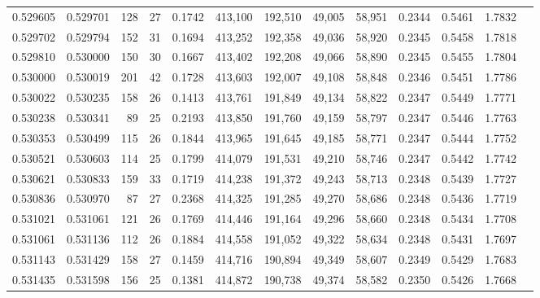 \begin{tabular}{rrrrrrrrrrrrr}
0.529605 & 0.529701 &    128 &    27 &                                     0.1742 & 413,100 & 192,510 &  49,005 &  58,951 & 0.2344 & 0.5461 & 1.7832 \\
0.529702 & 0.529794 &    152 &    31 &                                     0.1694 & 413,252 & 192,358 &  49,036 &  58,920 & 0.2345 & 0.5458 & 1.7818 \\
0.529810 & 0.530000 &    150 &    30 &                                     0.1667 & 413,402 & 192,208 &  49,066 &  58,890 & 0.2345 & 0.5455 & 1.7804 \\
0.530000 & 0.530019 &    201 &    42 &                                     0.1728 & 413,603 & 192,007 &  49,108 &  58,848 & 0.2346 & 0.5451 & 1.7786 \\
0.530022 & 0.530235 &    158 &    26 &                                     0.1413 & 413,761 & 191,849 &  49,134 &  58,822 & 0.2347 & 0.5449 & 1.7771 \\
0.530238 & 0.530341 &     89 &    25 &                                     0.2193 & 413,850 & 191,760 &  49,159 &  58,797 & 0.2347 & 0.5446 & 1.7763 \\
0.530353 & 0.530499 &    115 &    26 &                                     0.1844 & 413,965 & 191,645 &  49,185 &  58,771 & 0.2347 & 0.5444 & 1.7752 \\
0.530521 & 0.530603 &    114 &    25 &                                     0.1799 & 414,079 & 191,531 &  49,210 &  58,746 & 0.2347 & 0.5442 & 1.7742 \\
0.530621 & 0.530833 &    159 &    33 &                                     0.1719 & 414,238 & 191,372 &  49,243 &  58,713 & 0.2348 & 0.5439 & 1.7727 \\
0.530836 & 0.530970 &     87 &    27 &                                     0.2368 & 414,325 & 191,285 &  49,270 &  58,686 & 0.2348 & 0.5436 & 1.7719 \\
0.531021 & 0.531061 &    121 &    26 &                                     0.1769 & 414,446 & 191,164 &  49,296 &  58,660 & 0.2348 & 0.5434 & 1.7708 \\
0.531061 & 0.531136 &    112 &    26 &                                     0.1884 & 414,558 & 191,052 &  49,322 &  58,634 & 0.2348 & 0.5431 & 1.7697 \\
0.531143 & 0.531429 &    158 &    27 &                                     0.1459 & 414,716 & 190,894 &  49,349 &  58,607 & 0.2349 & 0.5429 & 1.7683 \\
0.531435 & 0.531598 &    156 &    25 &                                     0.1381 & 414,872 & 190,738 &  49,374 &  58,582 & 0.2350 & 0.5426 & 1.7668 \\

\end{tabular}
